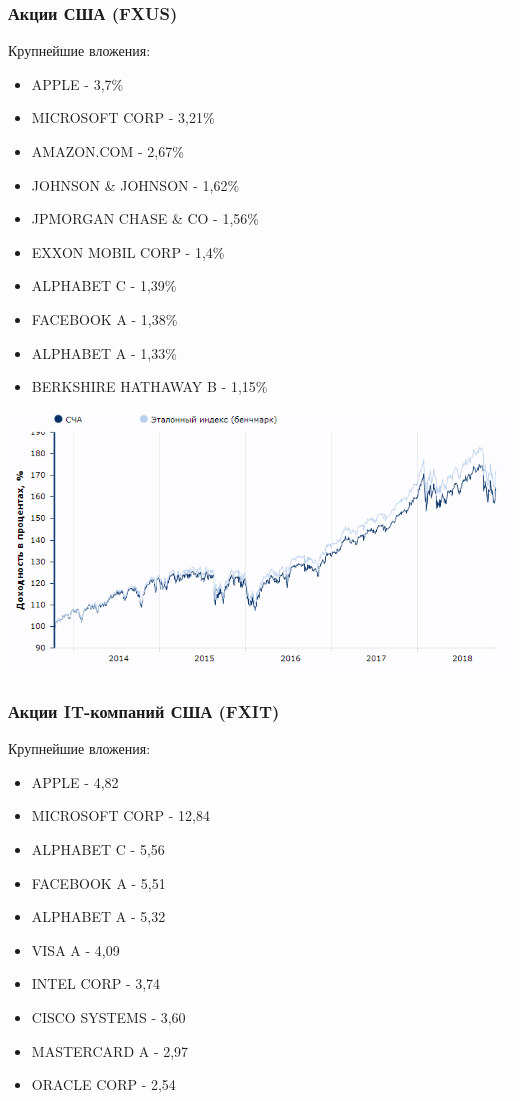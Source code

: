 \subsubsection{Акции США (FXUS)}

Крупнейшие вложения:

\begin{itemize}
	\item APPLE - 3,7\%
	\item MICROSOFT CORP - 3,21\%
	\item AMAZON.COM - 2,67\%
	\item JOHNSON \& JOHNSON - 1,62\%
	\item JPMORGAN CHASE \& CO - 1,56\%
	\item EXXON MOBIL CORP - 1,4\%
	\item ALPHABET C - 1,39\%
	\item FACEBOOK A - 1,38\%
	\item ALPHABET A - 1,33\%
	\item BERKSHIRE HATHAWAY B - 1,15\%
\end{itemize}

\includegraphics[width=16cm]{pics/alina/usa.png}

\subsubsection{Акции IT-компаний США (FXIT)}

Крупнейшие вложения:

\begin{itemize}
	\item APPLE	- 4,82%
	\item MICROSOFT CORP - 12,84%
	\item ALPHABET C - 5,56%
	\item FACEBOOK A - 5,51%
	\item ALPHABET A - 5,32%
	\item VISA A - 4,09%
	\item INTEL CORP - 3,74%
	\item CISCO SYSTEMS - 3,60%
	\item MASTERCARD A - 2,97%
	\item ORACLE CORP - 2,54%
\end{itemize}

